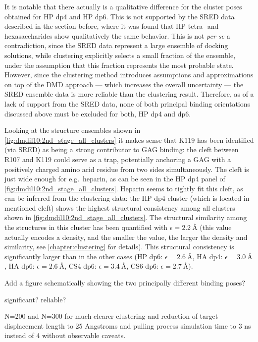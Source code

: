 It is notable that there actually is a qualitative difference for the cluster
poses obtained for HP dp4 and HP dp6. This is not supported by the SRED data
described in the section before, where it was found that HP tetra- and
hexasaccharides show qualitatively the same behavior. This is not \textit{per
se} a contradiction, since the SRED data represent a large ensemble of docking
solutions, while clustering explicitly selects a small fraction of the ensemble,
under the assumption that this fraction represents the most probable state.
However, since the clustering method introduces assumptions and approximations
on top of the DMD approach --- which increases the overall uncertainty --- the
SRED ensemble data is more reliable than the clustering result. Therefore, as of
a lack of support from the SRED data, none of both principal binding
orientations discussed above must be excluded for both, HP dp4 and dp6.


Looking at the structure ensembles shown in
\cref{fig:dmdil10:2nd_stage_all_clusters} it makes sense that K119 has been
identified (via SRED) as being a strong contributor to GAG binding: the cleft
between R107 and K119 could serve as a trap, potentially anchoring a GAG with a
positively charged amino acid residue from two sides simultaneously. The cleft
is just wide enough for e.g.\ heparin, as can be seen in the HP dp4 panel of
\cref{fig:dmdil10:2nd_stage_all_clusters}. Heparin seems to tightly fit this
cleft, as can be inferred from the clustering data: the HP dp4 cluster (which is
located in mentioned cleft) shows the highest structural consistency among all
clusters shown in \cref{fig:dmdil10:2nd_stage_all_clusters}. The structural
similarity among the structures in this cluster has been quantified with
$\epsilon = \SI{2.2}{\angstrom}$ (this value actually encodes a density, and the
smaller the value, the larger the density and similarity, see
\cref{chapter:clustering} for details). This structural consistency is
significantly larger than in the other cases (HP dp6: $\epsilon =
\SI{2.6}{\angstrom}$, HA dp4: $\epsilon = \SI{3.0}{\angstrom}$, HA dp6:
$\epsilon = \SI{2.6}{\angstrom}$, CS4 dp6: $\epsilon = \SI{3.4}{\angstrom}$, CS6
dp6: $\epsilon = \SI{2.7}{\angstrom}$).



Add a figure schematically showing the two principally different binding poses?


 significant? reliable?

N=200 and N=300 for much clearer clustering and reduction of target displacement
length to 25 Angstroms and pulling process simulation time to 3 ns instead of 4
without observable caveats.

